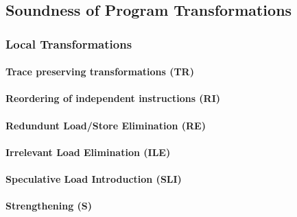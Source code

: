 



\subsection{Soundness of Program Transformations}
\label{sec:bgrnd-opt-sound}

\subsubsection{Local Transformations}

\paragraph{Trace preserving transformations (TR)}

\paragraph{Reordering of independent instructions (RI)}

\paragraph{Redundunt Load/Store Elimination (RE)}

\paragraph{Irrelevant Load Elimination (ILE)}

\paragraph{Speculative Load Introduction (SLI)}

\paragraph{Strengthening (S)}


